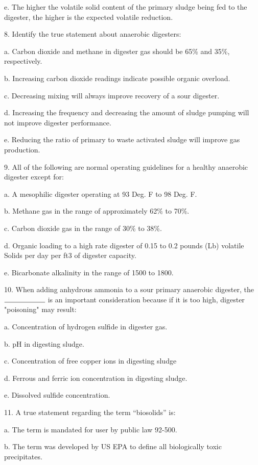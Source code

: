 \documentclass{article}
\begin{document}
e. The higher the volatile solid content of the primary sludge being fed to the digester, the higher is the expected volatile reduction. 


8. Identify the true statement about anaerobic digesters: 

a. Carbon dioxide and methane in digester gas should be 65\% and 35\%, respectively. 

b. Increasing carbon dioxide readings indicate possible organic overload. 

c. Decreasing mixing will always improve recovery of a sour digester. 

d. Increasing the frequency and decreasing the amount of sludge pumping will not improve digester performance. 

e. Reducing the ratio of primary to waste activated sludge will improve gas production. 


9. All of the following are normal operating guidelines for a healthy anaerobic digester except for: 

a. A mesophilic digester operating at 93 Deg. F to 98 Deg. F. 

b. Methane gas in the range of approximately 62\% to 70\%. 

c. Carbon dioxide gas in the range of 30\% to 38\%. 

d. Organic loading to a high rate digester of 0.15 to 0.2 pounds (Lb) volatile Solids per day per ft3 of digester capacity. 

e. Bicarbonate alkalinity in the range of 1500 to 1800. 


10. When adding anhydrous ammonia to a sour primary anaerobic digester, the $\rule{2cm}{0.15mm}$ is an important consideration because if it is too high, digester "poisoning" may result: 

a. Concentration of hydrogen sulfide in digester gas. 

b. pH in digesting sludge. 

c. Concentration of free copper ions in digesting sludge 

d. Ferrous and ferric ion concentration in digesting sludge. 

e. Dissolved sulfide concentration. 


11. A true statement regarding the term “biosolids” is: 

a. The term is mandated for user by public law 92-500. 

b. The term was developed by US EPA to define all biologically toxic precipitates. 
\end{document}
